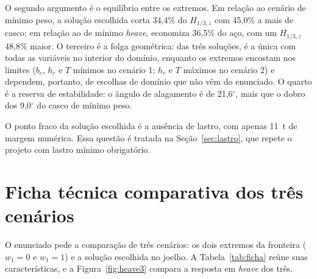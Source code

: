 \documentclass[11pt,a4paper]{article}
\newcommand{\Hz}{H_{1/3,z}}
\begin{document}
O segundo argumento é o equilíbrio entre os extremos. Em relação ao cenário de mínimo peso, a
solução escolhida corta 34,4\% do $\Hz$ com 45,0\% a mais de casco; em relação ao de mínimo
\emph{heave}, economiza 36,5\% do aço, com um $\Hz$ 48,8\% maior. O terceiro é a folga geométrica:
das três soluções, é a única com todas as variáveis no interior do domínio, enquanto os extremos
encostam nos limites ($b_c$, $h_c$ e $T$ mínimos no cenário 1; $h_c$ e $T$ máximos no cenário 2) e
dependem, portanto, de escolhas de domínio que não vêm do enunciado. O quarto é a reserva de
estabilidade: o ângulo de alagamento é de 21,6$^\circ$, mais que o dobro dos 9,0$^\circ$ do casco
de mínimo peso.

O ponto fraco da solução escolhida é a ausência de lastro, com apenas 11~t de margem numérica. Essa
questão é tratada na Seção~\ref{sec:lastro}, que repete o projeto com lastro mínimo obrigatório.

\section{Ficha técnica comparativa dos três cenários}\label{sec:cenarios}

O enunciado pede a comparação de três cenários: os dois extremos da fronteira ($w_1 = 0$ e
$w_1 = 1$) e a solução escolhida no joelho. A Tabela~\ref{tab:ficha} reúne suas características,
e a Figura~\ref{fig:heave3} compara a resposta em \emph{heave} dos três.
\end{document}
